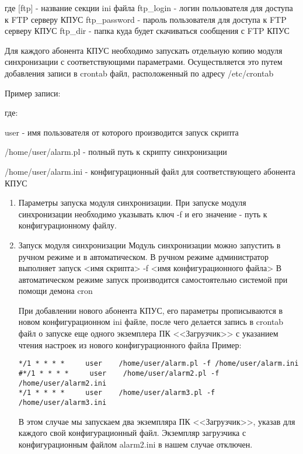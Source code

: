﻿\documentclass[12pt]{article}[a4paper,14pt,russian]
\begin{document}
где
[ftp] - название секции ini файла
ftp\_login - логин пользователя для доступа к FTP серверу КПУС
ftp\_password - пароль пользователя для доступа к FTP серверу КПУС
ftp\_dir - папка куда будет  скачиваться сообщения с FTP КПУС

Для каждого абонента КПУС необходимо запускать отдельную копию модуля синхронизации с соответствующими параметрами. Осуществляется это путем добавления записи в crontab файл, расположенный по адресу /etc/crontab

Пример записи:

	
	где:
	
user - имя пользователя от которого производится запуск скрипта


/home/user/alarm.pl - полный путь к скрипту синхронизации

/home/user/alarm.ini - конфигурационный файл для соответствующего абонента КПУС

\begin{enumerate}
\item Параметры запуска модуля синхронизации.
При запуске модуля синхронизации необходимо указывать ключ -f и его значение - путь к конфигурационному файлу.
\item Запуск модуля синхронизации
Модуль синхронизации можно запустить в ручном режиме и в автоматическом. В ручном режиме администратор выполняет запуск 
<имя скрипта> -f <имя конфигурационного файла>
В автоматическом режиме запуск производится самостоятельно системой при помощи демона cron

При добавлении нового абонента КПУС, его параметры прописываются в новом конфигурационном ini файле, после чего делается запись в crontab файл о запуске еще одного экземплера ПК <<Загрузчик>>  с указанием чтения настроек из нового конфигурационного файла
Пример:
\begin{verbatim}
*/1 * * * *     user    /home/user/alarm.pl -f /home/user/alarm.ini
#*/1 * * * *     user    /home/user/alarm2.pl -f /home/user/alarm2.ini
*/1 * * * *     user    /home/user/alarm3.pl -f /home/user/alarm3.ini

\end{verbatim}
В этом случае мы запускаем два экземпляра ПК <<Загрузчик>>, указав для каждого свой конфигурационный файл. Экземпляр загрузчика с конфигурационным файлом alarm2.ini в нашем случае отключен.
\end{enumerate}
\end{document}
